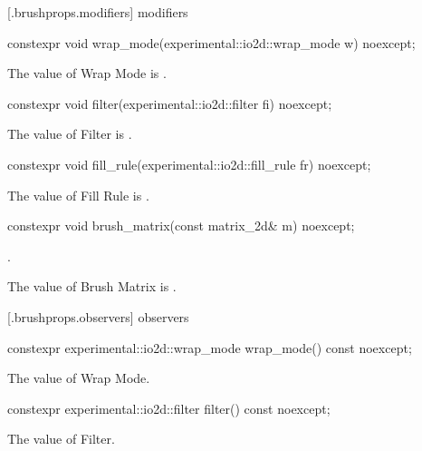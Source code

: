  [\iotwod.brushprops.modifiers] { modifiers}

\begin{itemdecl}
constexpr void wrap_mode(experimental::io2d::wrap_mode w) noexcept;
\end{itemdecl}
\begin{itemdescr}
\pnum
\effects
The value of Wrap Mode is .
\end{itemdescr}

\begin{itemdecl}
constexpr void filter(experimental::io2d::filter fi) noexcept;
\end{itemdecl}
\begin{itemdescr}
\pnum
\effects
The value of Filter is .
\end{itemdescr}

\begin{itemdecl}
constexpr void fill_rule(experimental::io2d::fill_rule fr) noexcept;
\end{itemdecl}
\begin{itemdescr}
\pnum
\effects
The value of Fill Rule is .
\end{itemdescr}

\begin{itemdecl}
constexpr void brush_matrix(const matrix_2d& m) noexcept;
\end{itemdecl}
\begin{itemdescr}
\pnum
\requires
{}.

\pnum
\effects
The value of Brush Matrix is .
\end{itemdescr}

 [\iotwod.brushprops.observers] { observers}

\begin{itemdecl}
constexpr experimental::io2d::wrap_mode wrap_mode() const noexcept;
\end{itemdecl}
\begin{itemdescr}
\pnum
\returns
The value of Wrap Mode.
\end{itemdescr}

\begin{itemdecl}
constexpr experimental::io2d::filter filter() const noexcept;
\end{itemdecl}
\begin{itemdescr}
\pnum
\returns
The value of Filter.
\end{itemdescr}

